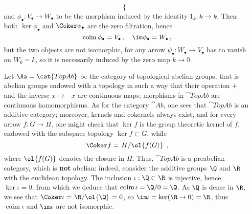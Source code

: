 \begin{ex}
\begin{equation*}
\begin{cases}
        \end{cases}
    \end{equation*}
    and $\phi_{\bullet} : V_{\bullet} \to W_{\bullet}$ to be the morphism
    induced by the identity $1_{k} : k \to k$. 
    Then both $\ker \phi_{\bullet}$ and $\Coker \phi_{\bullet}$
    are the zero filtration, hence
    \begin{equation*}
        \operatorname{coim}\phi_{\bullet} = V_{\bullet}\,, \quad
        \im \phi_{\bullet} = W_{\bullet}\,,
    \end{equation*}
    but the two objects are not isomorphic, for any arrow
    $\psi_{\bullet}:W_{\bullet} \to V_{\bullet}$ has to vanish on $W_{0}=k$,
    so it is necessarily induced by the zero map $k \to 0$.
\end{ex}

\begin{ex}
    Let $\Aa = \cat{TopAb}$ be the category of topological abelian groups,
    that is abelian groups endowed with a topology in such a way that
    their operation $+$ and the inverse $x \mapsto -x$ are continuous maps;
    morphisms in $\cat{TopAb}$ are continuous homomorphisms.
    As for the category $\cat{Ab}$, one sees that $\cat{TopAb}$
    is an additive category; moreover, kernels and cokernels always exist,
    and for every arrow $f:G \to H$, one might check that
    $\ker f$ is the group theoretic kernel of $f$,
    endowed with the subspace topology $\ker f \subset G$,
    while
    \begin{equation*}
        \Coker f = \left. H \middle/ \ol{f(G)} \right. {\,,}
    \end{equation*}
    where $\ol{f(G)}$ denotes the closure in $H$.
    Thus, $\cat{TopAb}$ is a preabelian category, which is \textbf{not} abelian:
    indeed, consider the additive groups $\Q$ and $\R$ with the euclidean topology.
    The inclusion $\iota : \Q \subset \R$ is injective, hence $\ker \iota = 0$,
    from which we deduce that $\operatorname{coim} \iota = \Q/0 = \Q$.
    As $\Q$ is dense in $\R$, we see that 
    $\Coker \iota = \left. \R \middle/ \ol{\Q}\right. = 0$,
    so $\im \iota = \ker(\R \to 0) = \R$, thus $\operatorname{coim} \iota$
    and $\im \iota$ are not isomorphic.
\end{ex}

